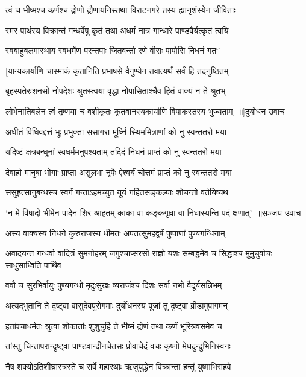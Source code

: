 \twolineshloka
{त्वं च भीष्मश्च कर्णश्च द्रोणो द्रौणायनिस्तथा}
{विराटनगरे तस्य ह्यानृशंस्येन जीविताः}


\twolineshloka
{स्मर पार्थस्य विक्रान्तं गन्धर्वेषु कृतं तथा}
{अधर्मं नात्र गान्धारे पाण्डवैर्यत्कृतं त्वयि}


\twolineshloka
{स्वबाहुबलमास्थाय स्वधर्मेण परन्तपाः}
{जितवन्तो रणे वीराः पापोसि निधनं गतः'}


\twolineshloka
{[यान्यकार्याणि चास्माकं कृतानिति प्रभाषसे}
{वैगुण्येन तवात्यर्थं सर्वं हि तदनुष्ठितम्}


\twolineshloka
{बृहस्पतेरुशनसो नोपदेशः श्रुतस्त्वया}
{वृद्धा नोपासिताश्चैव हितं वाक्यं न ते श्रुतभ्}


\threelineshloka
{लोभेनातिबलेन त्वं तृष्णया च वशीकृतः}
{कृतवानस्यकार्याणि विपाकस्तस्य भुज्यताम् ॥]दुर्योधन उवाच}
{}


\twolineshloka
{अधीतं विधिवद्दत्तं भूः प्रभुक्ता ससागरा}
{मूर्ध्नि स्थिममित्राणां को नु स्वन्ततरो मया}


\twolineshloka
{यदिष्टं क्षत्रबन्धूनां स्वधर्ममनुपश्यताम्}
{तदिदं निधनं प्राप्तं को नु स्वन्ततरो मया}


\twolineshloka
{देवार्हा मानुषा भोगाः प्राप्ता असुलभा नृपैः}
{ऐश्वर्यं चोत्तमं प्राप्तं को नु स्वन्ततरो मया}


\twolineshloka
{ससुहृत्सानुबन्धस्च स्वर्गं गन्ताऽहमच्युत}
{यूयं गर्हितसङ्कल्पाः शोचन्तो वर्तयिष्यथ}


\threelineshloka
{`न मे विषादो भीमेन पादेन शिर आहतम्}
{काका वा कङ्कगृध्रा वा निधास्यन्ति पदं क्षणात्' ॥सञ्जय उवाच}
{}


\twolineshloka
{अस्य वाक्यस्य निधने कुरुराजस्य धीमतः}
{अपतत्सुमहद्वर्षं पुष्पाणां पुण्यगन्धिनाम्}


अवादयन्त गन्धर्वा वादित्रं सुमनोहरम्
\twolineshloka
{जगुश्चाप्सरसो राज्ञो यशः सम्बद्धमेव च}
{सिद्धाश्च मुमुचुर्वाचः साधुसाध्विति पार्थिव}


\twolineshloka
{ववौ च सुरभिर्वायुः पुण्यगन्धो मृदुःसुखः}
{व्यराजंश्च दिशः सर्वा नभो वैदूर्यसन्निभम्}


\twolineshloka
{अत्यद्भुतानि ते दृष्ट्वा वासुदेवपुरोगमाः}
{दुर्योधनस्य पूजां तु दृष्ट्वा व्रीडामुपागमन्}


\twolineshloka
{हतांश्चाधर्मतः श्रुत्वा शोकार्ताः शुशुचुर्हि ते}
{भीष्मं द्रोणं तथा कर्णं भूरिश्रवसमेव च}


\twolineshloka
{तांस्तु चिन्तापरान्दृष्ट्वा पाण्डवान्दीनचेतसः}
{प्रोवाचेदं वचः कृष्णो मेघदुन्दुभिनिस्वनः}


\twolineshloka
{नैष शक्योऽतिशीघ्रास्त्रस्ते च सर्वे महारथाः}
{ऋजुयुद्धेन विक्रान्ता हन्तुं युष्माभिराहवे}


